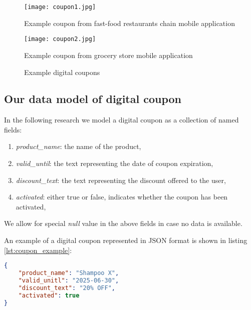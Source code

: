 \documentclass[licencjacka,en]{pracamgr}
\begin{document}
\begin{figure}[h]
    \centering
    \begin{minipage}{0.45\textwidth}
        \centering
        \texttt{[image: coupon1.jpg]}
        \caption{Example coupon from fast-food restaurants chain mobile application}
    \end{minipage}
    \hfill
    \begin{minipage}{0.45\textwidth}
        \centering
        \texttt{[image: coupon2.jpg]}
        \caption{Example coupon from grocery store mobile application}
    \end{minipage}
    \caption{Example digital coupons}
    \label{fig:example_coupons}
\end{figure}


\subsection{Our data model of digital coupon}
\label{sec:coupon_model}
In the following research we model a digital coupon as a collection of named fields:
\begin{enumerate}
    \item \textit{product\_name}: the name of the product,
    \item \textit{valid\_until}: the text representing the date of coupon expiration,
    \item \textit{discount\_text}: the text representing the discount offered to the user,
    \item \textit{activated}: either true or false, indicates whether the coupon has been activated,
\end{enumerate}
We allow for special \textit{null} value in the above fields in case no data is available.

An example of a digital coupon represented in JSON format is shown in listing \ref{lst:coupon_example}:

\begin{lstlisting}[language=json, caption={Example of a digital coupon in JSON format}, label={lst:coupon_example}]
{
    "product_name": "Shampoo X",
    "valid_unitl": "2025-06-30",
    "discount_text": "20% OFF",
    "activated": true
}
\end{lstlisting}
\end{document}
